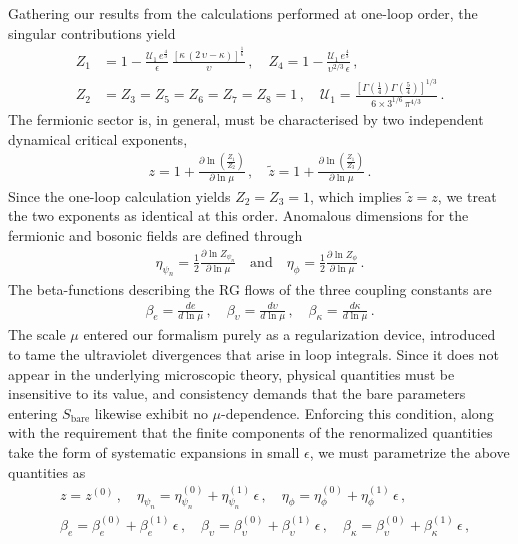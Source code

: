 Gathering our results from the calculations performed at one-loop order, the singular contributions yield
\begin{align}
\label{eqZvals}
Z_1 &= 1 - \frac{\mathcal{U}_1\,e^{\frac{4}{3}}}{\epsilon}\,
\frac{\left[\kappa\,(2\,\upsilon - \kappa)\right]^{\frac{1}{6}}}{\upsilon}\,, 
\quad Z_4 = 1 - \frac{\mathcal{U}_1\,e^{\frac{4}{3}}}{\upsilon^{2/3}\,\epsilon}\,, 
\nonumber \\
Z_2 &= Z_3 = Z_5 = Z_6 = Z_7 = Z_8 = 1\,, \quad
\mathcal{U}_1 = \frac{\left[\Gamma\!\left(\tfrac{1}{4}\right)
\Gamma\!\left(\tfrac{5}{4}\right)\right]^{1/3}}
{6 \times 3^{1/6}\,\pi^{4/3}}\,.
\end{align}
The fermionic sector is, in general, must be characterised by two independent 
dynamical critical exponents,
\begin{align}
z = 1 + \frac{\partial \ln\!\left(\frac{Z_1}{Z_2}\right)}{\partial \ln \mu}\,, 
\quad \tilde{z} = 1 + 
\frac{\partial \ln\!\left(\frac{Z_1}{Z_3}\right)}{\partial \ln \mu}\,.
\end{align}
Since the one-loop calculation yields $Z_2 = Z_3 = 1$, which implies 
$\tilde{z} = z$, we treat the two exponents as identical at this 
order. Anomalous dimensions for the fermionic and bosonic fields are 
defined through
\begin{align}
\eta_{\psi_n} = \frac{1}{2}\frac{\partial \ln Z_{\psi_n}}{\partial \ln \mu} 
\quad \text{and} \quad
\eta_\phi = \frac{1}{2}\frac{\partial \ln Z_\phi}{\partial \ln \mu}\,.
\end{align}
The beta-functions describing the RG flows of the three 
coupling constants are
\begin{align}
\beta_e = \frac{de}{d\ln\mu}\,, \quad 
\beta_\upsilon = \frac{d\upsilon}{d\ln\mu}\,, \quad 
\beta_\kappa = \frac{d\kappa}{d\ln\mu}\,.
\end{align}
The scale $\mu$ entered our formalism purely as a regularization device, 
introduced to tame the ultraviolet divergences that arise in loop 
integrals. Since it does not appear in the underlying microscopic theory, 
physical quantities must be insensitive to its value, and consistency 
demands that the bare parameters entering $S_{\text{bare}}$ likewise 
exhibit no $\mu$-dependence. Enforcing this condition, along with the 
requirement that the finite components of the renormalized quantities 
take the form of systematic expansions in small $\epsilon$, we must parametrize
the above quantities as
\begin{align}
\label{eqexp}
& z = z^{(0)}\,, \quad
\eta_{\psi_n} = \eta_{\psi_n}^{(0)} + \eta_{\psi_n}^{(1)}\,\epsilon\,, \quad
\eta_\phi = \eta_\phi^{(0)} + \eta_\phi^{(1)}\,\epsilon\,, \nonumber \\
& \beta_e = \beta_e^{(0)} + \beta_e^{(1)}\,\epsilon\,, \quad
\beta_\upsilon = \beta_\upsilon^{(0)} + \beta_\upsilon^{(1)}\,\epsilon\,, \quad
\beta_\kappa = \beta_\upsilon^{(0)} + \beta_\kappa^{(1)}\,\epsilon\,,
\end{align}
